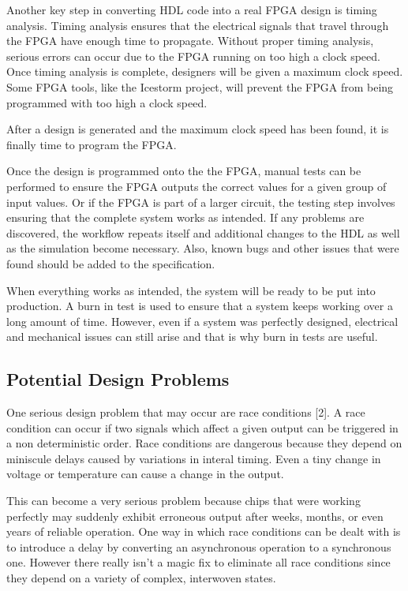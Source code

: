 \documentclass{article}
\begin{document}
    Another key step in converting HDL code into a real FPGA design is timing analysis.
    Timing analysis ensures that the electrical signals that travel through the FPGA
    have enough time to propagate. Without proper timing analysis, serious errors
    can occur due to the FPGA running on too high a clock speed. Once timing analysis
    is complete, designers will be given a maximum clock speed.
    Some FPGA tools, like the Icestorm project, will prevent the FPGA from being
    programmed with too high a clock speed.
    
    After a design is generated and the maximum clock speed has been found,
    it is finally time to program the FPGA.

    Once the design is programmed onto the the FPGA, manual tests can be performed
    to ensure the FPGA outputs the correct values for a given group of input values.
    Or if the FPGA is part of a larger circuit, the testing step involves ensuring
    that the complete system works as intended. If any problems are discovered,
    the workflow repeats itself and additional changes to the HDL as well as
    the simulation become necessary. Also, known bugs and other issues that were found
    should be added to the specification.

    When everything works as intended, the system will be ready to be put into production.
    A burn in test is used to ensure that a system keeps working over a long amount of time.
    However, even if a system was perfectly designed, electrical and mechanical issues
    can still arise and that is why burn in tests are useful.

    \subsection{Potential Design Problems}

    One serious design problem that may occur are race conditions [2].
    A race condition can occur if two signals which affect a given output
    can be triggered in a non deterministic order. Race conditions are dangerous
    because they depend on miniscule delays caused by variations in interal timing.
    Even a tiny change in voltage or temperature can cause a change in the output.

    This can become a very serious problem because chips that were working perfectly
    may suddenly exhibit erroneous output after weeks, months, or even years of
    reliable operation. One way in which race conditions can be dealt with
    is to introduce a delay by converting an asynchronous operation to a synchronous one.
    However there really isn't a magic fix to eliminate all race conditions since
    they depend on a variety of complex, interwoven states.
\end{document}
